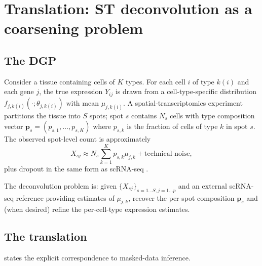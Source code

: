 \section{Translation: ST deconvolution as a coarsening problem}
\label{sec:translation}

\subsection{The DGP}

Consider a tissue containing cells of $K$ types. For each cell $i$
of type $k(i)$ and each gene $j$, the true expression $Y_{ij}$ is
drawn from a cell-type-specific distribution $f_{j,k(i)}(\cdot;
\theta_{j,k(i)})$ with mean $\mu_{j,k(i)}$. A spatial-transcriptomics
experiment partitions the tissue into $S$ spots; spot $s$ contains
$N_s$ cells with type composition vector $\bm{p}_s = (p_{s,1}, \ldots,
p_{s,K})$ where $p_{s,k}$ is the fraction of cells of type $k$ in
spot $s$. The observed spot-level count is approximately
\begin{equation}
  X_{sj} \approx N_s \sum_{k=1}^K p_{s,k} \mu_{j,k} + \text{technical noise},
  \label{eq:trans-spot}
\end{equation}
plus dropout in the same form as scRNA-seq
\citep{towell2026scrnacoarsening}.

The deconvolution problem is: given $\{X_{sj}\}_{s=1\ldots S,
j=1\ldots p}$ and an external scRNA-seq reference providing estimates
of $\mu_{j,k}$, recover the per-spot composition $\bm{p}_s$ and (when
desired) refine the per-cell-type expression estimates.

\subsection{The translation}

 states the explicit correspondence to
masked-data inference.


